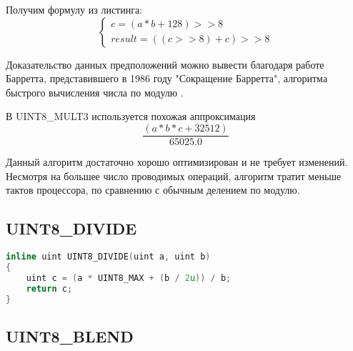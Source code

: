 Получим формулу из листинга: 
\begin{equation}
\begin{cases} 
c = (a * b + 128) >> 8 \\
result = ((c >> 8) + c) >> 8
\end{cases}
\end{equation}

Доказательство данных  предположений можно вывести благодаря работе Барретта, представившего в 1986 году  "Сокращение Барретта", алгоритма быстрого вычисления числа по модулю \cite{bib7}.

В  UINT8\_MULT3 используется похожая аппроксимация 
\begin{equation}
\frac{(a * b * c + 32512)}{65025.0}
\end{equation}

Данный алгоритм достаточно хорошо оптимизирован и не требует изменений. Несмотря на большее число проводимых операций, алгоритм тратит меньше тактов процессора, по сравнению с обычным делением по модулю.

\subsection{UINT8\_DIVIDE}
\begin{lstlisting}[language=c++]
inline uint UINT8_DIVIDE(uint a, uint b)
{
    uint c = (a * UINT8_MAX + (b / 2u)) / b;
    return c;
}
\end{lstlisting}

\subsection{UINT8\_BLEND}
